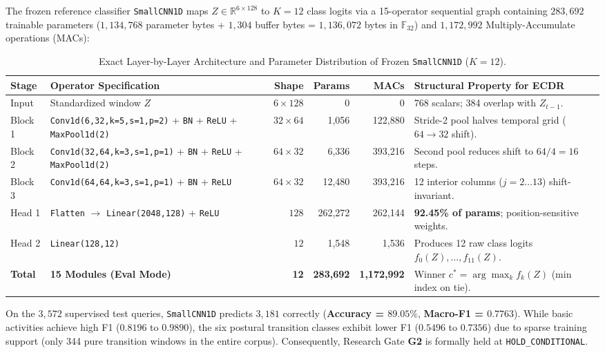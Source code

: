 \documentclass[11pt,a4paper]{article}
\newcommand{\R}{\mathbb{R}}
\newcommand{\F}{\mathbb{F}}
\newcommand{\code}[1]{{\small\ttfamily\nolinkurl{#1}}}
\theoremstyle{remark}
\begin{document}
The frozen reference classifier \code{SmallCNN1D} maps $Z \in \R^{6 \times 128}$ to $K=12$ class logits via a 15-operator sequential graph containing $283,692$ trainable parameters ($1,134,768$ parameter bytes + $1,304$ buffer bytes = $1,136,072$ bytes in $\F_{32}$) and $1,172,992$ Multiply-Accumulate operations (MACs):

\begin{table}[!htbp]
\centering\footnotesize
\caption{Exact Layer-by-Layer Architecture and Parameter Distribution of Frozen \code{SmallCNN1D} ($K=12$).}
\label{tab:arch}
\begin{tabularx}{\linewidth}{@{}lP{4.7cm}rrrY@{}}
\toprule
\textbf{Stage} & \textbf{Operator Specification} & \textbf{Shape} & \textbf{Params} & \textbf{MACs} & \textbf{Structural Property for ECDR} \\
\midrule
Input & Standardized window $Z$ & $6 \times 128$ & 0 & 0 & 768 scalars; 384 overlap with $Z_{t-1}$. \\
Block 1 & \code{Conv1d(6,32,k=5,s=1,p=2)} + \code{BN} + \code{ReLU} + \code{MaxPool1d(2)} & $32 \times 64$ & 1,056 & 122,880 & Stride-2 pool halves temporal grid ($64 \to 32$ shift). \\
Block 2 & \code{Conv1d(32,64,k=3,s=1,p=1)} + \code{BN} + \code{ReLU} + \code{MaxPool1d(2)} & $64 \times 32$ & 6,336 & 393,216 & Second pool reduces shift to $64/4 = 16$ steps. \\
Block 3 & \code{Conv1d(64,64,k=3,s=1,p=1)} + \code{BN} + \code{ReLU} & $64 \times 32$ & 12,480 & 393,216 & 12 interior columns ($j=2\dots13$) shift-invariant. \\
Head 1 & \code{Flatten} $\to$ \code{Linear(2048,128)} + \code{ReLU} & $128$ & 262,272 & 262,144 & \textbf{92.45\% of params}; position-sensitive weights. \\
Head 2 & \code{Linear(128,12)} & $12$ & 1,548 & 1,536 & Produces 12 raw class logits $f_0(Z),\dots,f_{11}(Z)$. \\
\midrule
\textbf{Total} & \textbf{15 Modules (Eval Mode)} & \textbf{12} & \textbf{283,692} & \textbf{1,172,992} & Winner $c^* = \arg\max_k f_k(Z)$ (min index on tie). \\
\bottomrule
\end{tabularx}
\end{table}

On the $3,572$ supervised test queries, \code{SmallCNN1D} predicts $3,181$ correctly (\textbf{Accuracy = $89.05\%$}, \textbf{Macro-F1 = $0.7763$}). While basic activities achieve high F1 ($0.8196$ to $0.9890$), the six postural transition classes exhibit lower F1 ($0.5496$ to $0.7356$) due to sparse training support (only 344 pure transition windows in the entire corpus). Consequently, Research Gate \textbf{G2} is formally held at \code{HOLD\_CONDITIONAL}.
\end{document}
